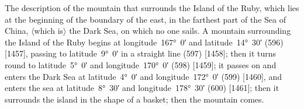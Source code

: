 \documentclass[11pt]{article}
\newcommand{\Pg}[1]{\marginpar{\footnotesize #1}}
\newcommand{\Ang}[1]{\ensuremath{#1}}
\begin{document}
\par{}\par

\par{}\par

\par{}\par

\par{}\par

\Pg{p. 42}The description of the mountain that surrounds the Island of the Ruby, which lies at the beginning of the boundary of the east, in the farthest part of the Sea of China, \Ang{\langle}which is\Ang{\rangle} the Dark Sea, on which no one sails. A mountain surrounding the Island of the Ruby begins at longitude~167°~0′ and latitude~14°~30′ (596) [1457], passing to latitude~9°~0′ in a straight line (597) [1458]; then it turns round to latitude~5°~0′ and longitude~170°~0′ (598) [1459]; it passes on and enters the Dark Sea at latitude~4°~0′ and longitude~172°~0′ (599) [1460], and enters the sea at latitude~8°~30′ and longitude~178°~30′ (600) [1461]; then it surrounds the island in the shape of a basket; then the mountain comes.
\end{document}
